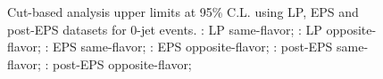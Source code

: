 \begin{figure}[!htbp]
\caption{Cut-based analysis upper limits at 95\% C.L. using LP, EPS and post-EPS datasets for 0-jet events.
: LP same-flavor; : LP opposite-flavor;
: EPS same-flavor; : EPS opposite-flavor;
: post-EPS same-flavor; : post-EPS opposite-flavor;
}
\label{fig:limits_0j_cut}
\end{figure}

\clearpage
